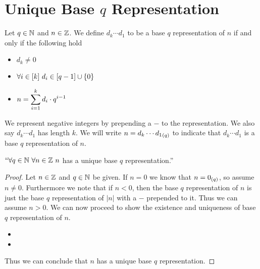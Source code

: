     \section{Unique Base $q$ Representation}
        \begin{definition}
            Let $q \in \mathbb{N}$ and $n \in \mathbb{Z}$. We define $d_k\cdots d_1$ to be a base
            $q$ representation of $n$ if and only if the following hold
            \begin{itemize}
                \item
                    $d_k \neq 0$
                \item
                    $\forall i \in [k] \ d_i \in [q - 1] \cup \left\{0\right\}$
                \item
                    $n = \displaystyle\sum_{i = 1}^k d_i \cdot q^{i - 1}$
            \end{itemize}
            We represent negative integers by prepending a $-$ to the representation. We also
            say $d_k\cdots d_1$ has length $k$. We will write $n = {d_k \cdots d_1}_{(q)}$ to indicate that
            $d_k \cdots d_1$ is a base $q$ representation of $n$.
        \end{definition}
        \begin{theorem}
            $``\forall q \in \mathbb{N} \ \forall n \in \mathbb{Z} \ n$ has a unique base $q$ representation.''
        \end{theorem}
        \begin{proof}
            Let $n \in \mathbb{Z}$ and $q \in \mathbb{N}$ be given. If $n = 0$ we know that
            $n = {0}_{(q)}$, so assume $n \neq 0$. Furthermore we note that if $n < 0$,
            then the base $q$ representation of $n$ is just the base $q$ representation of $|n|$
            with a $-$ prepended to it. Thus we can assume $n > 0$. We can now proceed to show
            the existence and uniqueness of base $q$ representation of $n$.
            \begin{itemize}
                \item
                \item
            \end{itemize}
            Thus we can conclude that $n$ has a unique base $q$ representation. \QED
        \end{proof}
